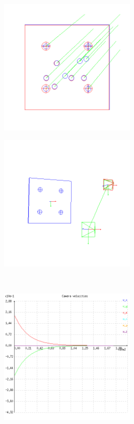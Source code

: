 \begin{figure}[ht!]
\centering
\begin{mdframed}[linecolor=black!30,backgroundcolor=black!5]
  \centering
  \begin{subfigure}{.48\textwidth}
    \centering
    \includegraphics[width=65mm]{figures/plots/ex3cimage.png}
    \caption{}
    \label{fig:ex3cimage}
  \end{subfigure}
  \begin{subfigure}{.48\textwidth}
    \centering
    \includegraphics[width=65mm]{figures/plots/ex3cscene.png}
    \caption{}
    \label{fig:ex3cscene}
  \end{subfigure}
  \\
  \begin{subfigure}{.48\textwidth}
    \centering
    \includegraphics[width=65mm]{figures/plots/ex3cvelocity.png}

\end{subfigure}
\end{mdframed}
\end{figure}
